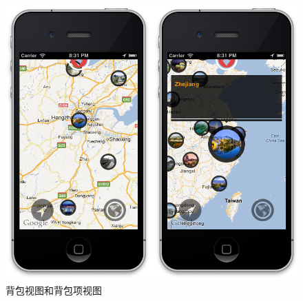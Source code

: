\documentclass{article}
\begin{document}
\begin{CJK}{UTF8}{gbsn}
  \begin{figure}[htbp]
		\centering
		\includegraphics[bb=0 0 790 744, scale=0.45]{figure/fig_n23.png}
		\caption{背包视图和背包项视图}
		\label{fig:n23}
	\end{figure}


\end{CJK}
\end{document}
